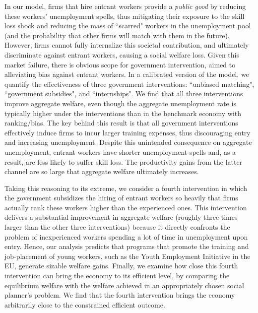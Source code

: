 \documentclass[12pt]{article} %
\theoremstyle{definition}
\begin{document}
 
In our model, firms that hire entrant workers provide a \textit{public good} by reducing these workers' unemployment spells, thus mitigating their exposure to the skill loss shock and reducing the mass of ``scarred" workers in the unemployment pool (and the probability that other firms will match with them in the future). However, firms cannot fully internalize this societal contribution, and ultimately discriminate against entrant workers, causing a social welfare loss. Given this market failure, there is obvious scope for government intervention, aimed to alleviating bias against entrant workers. In a calibrated version of the model, we quantify the effectiveness of three government interventions: ``unbiased matching", ``government subsidies", and ``internships". We find that all three interventions improve aggregate welfare, even though the aggregate unemployment rate is typically higher under the interventions than in the benchmark economy with ranking/bias. The key behind this result is that all government interventions effectively induce firms to incur larger training expenses, thus discouraging entry and increasing unemployment. Despite this unintended consequence on aggregate unemployment, entrant workers have shorter unemployment spells and, as a result, are less likely to suffer skill loss. The productivity gains from the latter channel are so large that aggregate welfare ultimately increases. 

Taking this reasoning to its extreme, we consider a fourth intervention in which the government subsidizes the hiring of entrant workers so heavily that firms actually rank these workers higher than the experienced ones. This intervention delivers a substantial improvement in aggregate welfare (roughly three times larger than the other three interventions) because it directly confronts the problem of inexperienced workers spending a lot of time in unemployment upon entry. Hence, our analysis predicts that programs that promote the training and job-placement of young workers, such as the Youth Employment Initiative in the EU, generate sizable welfare gains. Finally, we examine how close this fourth intervention can bring the economy to its efficient level, by comparing the equilibrium welfare with the welfare achieved in an appropriately chosen social planner's problem. 
We find that the fourth intervention brings the economy arbitrarily close to the constrained efficient outcome. 



\newpage


\setlength{\bibsep}{0pt}
%

 
\end{document}
